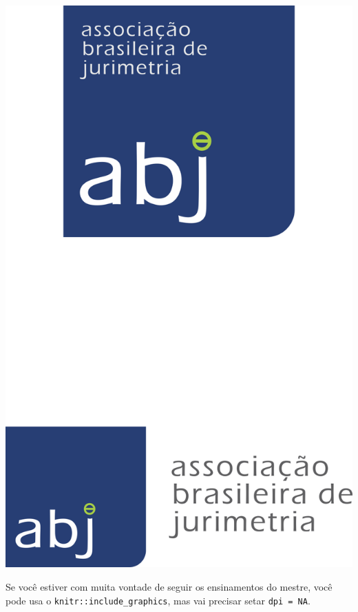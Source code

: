 \documentclass[12pt,]{report}
\let\origfigure\figure
\let\endorigfigure\endfigure
\renewenvironment{figure}[1][2] {
    \expandafter\origfigure\expandafter[H]
} {
    \endorigfigure
}
\begin{document}
\begin{figure}
\centering
\includegraphics{imgs/logo_abj.png}
\caption{Essa é a caption.}\label{fig:logo}
\end{figure}

Se você estiver com muita vontade de seguir os ensinamentos do mestre,
você pode usa o \texttt{knitr::include\_graphics}, mas vai precisar
setar \texttt{dpi\ =\ NA}.
\end{document}

